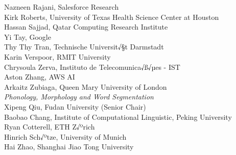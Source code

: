 \hspace*{0.2in} Nazneen Rajani, Salesforce Research\\
\hspace*{0.2in} Kirk Roberts, University of Texas Health Science Center at Houston\\
\hspace*{0.2in} Hassan Sajjad, Qatar Computing Research Institute\\
\hspace*{0.2in} Yi Tay, Google\\
\hspace*{0.2in} Thy Thy Tran, Technische Universit√§t Darmstadt\\
\hspace*{0.2in} Karin Verspoor, RMIT University\\
\hspace*{0.2in} Chrysoula Zerva, Instituto de Telecomunica√ß√µes - IST\\
\hspace*{0.2in} Aston Zhang, AWS AI\\
\hspace*{0.2in} Arkaitz Zubiaga, Queen Mary University of London\\

\emph{Phonology, Morphology and Word Segmentation} \\
\hspace*{0.2in} Xipeng Qiu, Fudan University (Senior Chair)\\
\hspace*{0.2in} Baobao Chang, Institute of Computational Linguistic, Peking University\\
\hspace*{0.2in} Ryan Cotterell, ETH Z√ºrich\\
\hspace*{0.2in} Hinrich Sch√ºtze, University of Munich\\
\hspace*{0.2in} Hai Zhao, Shanghai Jiao Tong University\\

